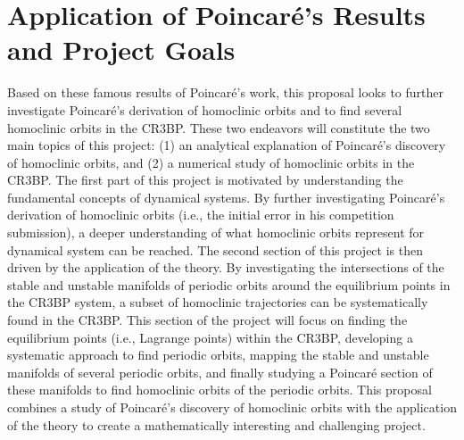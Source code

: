 \documentclass[11pt]{article} %
\begin{document}
\section*{Application of Poincaré's Results and Project Goals} 
Based on these famous results of Poincaré's work, this proposal looks to further investigate Poincaré's derivation of homoclinic orbits and to find several homoclinic orbits in the CR3BP. These two endeavors will constitute the two main topics of this project: (1) an analytical explanation of Poincaré's discovery of homoclinic orbits, and (2) a numerical study of homoclinic orbits in the CR3BP. The first part of this project is motivated by understanding the fundamental concepts of dynamical systems. By further investigating Poincaré's derivation of homoclinic orbits (i.e., the initial error in his competition submission), a deeper understanding of what homoclinic orbits represent for dynamical system can be reached. The second section of this project is then driven by the application of the theory. By investigating the intersections of the stable and unstable manifolds of periodic orbits around the equilibrium points in the CR3BP system, a subset of homoclinic trajectories can be systematically found in the CR3BP. This section of the project will focus on finding the equilibrium points (i.e., Lagrange points) within the CR3BP, developing a systematic approach to find periodic orbits, mapping the stable and unstable manifolds of several periodic orbits, and finally studying a Poincaré section of these manifolds to find homoclinic orbits of the periodic orbits. This proposal combines a study of Poincaré's discovery of homoclinic orbits with the application of the theory to create a mathematically interesting and challenging project. 

\newpage


\end{document}
